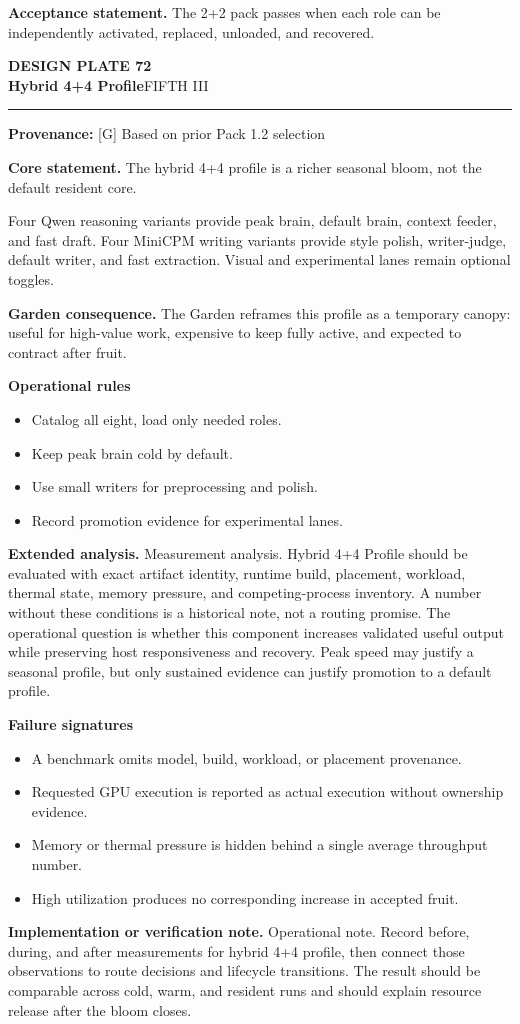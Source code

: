 \documentclass[10pt,letterpaper,oneside]{article}
\newcommand{\prov}[1]{\textcolor{gardenBlue}{\sffamily\footnotesize\textbf{Provenance:} #1}}
\newcommand{\platetitle}[3]{%
  \begin{minipage}[t][0.54in][t]{\textwidth}
  {\sffamily\bfseries\color{gardenDeep}\fontsize{9}{10}\selectfont DESIGN PLATE #1}\\[-1pt]
  {\sffamily\bfseries\color{gardenInk}\fontsize{16.5}{18}\selectfont #2}\hfill{\sffamily\color{gardenGreen}\large #3}
  \end{minipage}\vspace{-2pt}\hrule\vspace{5pt}}
\begin{document}
\begin{acceptbox}
\textbf{Acceptance statement.} The 2+2 pack passes when each role can be independently activated, replaced, unloaded, and recovered.
\end{acceptbox}
\newpage
\platetitle{72}{Hybrid 4+4 Profile}{FIFTH III}
\prov{[G] Based on prior Pack 1.2 selection}
\fontsize{8.85}{10.45}\selectfont
\begin{corebox}
\textbf{Core statement.} The hybrid 4+4 profile is a richer seasonal bloom, not the default resident core.
\end{corebox}
Four Qwen reasoning variants provide peak brain, default brain, context feeder, and fast draft. Four MiniCPM writing variants provide style polish, writer-judge, default writer, and fast extraction. Visual and experimental lanes remain optional toggles.

\textbf{Garden consequence.} The Garden reframes this profile as a temporary canopy: useful for high-value work, expensive to keep fully active, and expected to contract after fruit.

\textbf{Operational rules}
\begin{itemize}
\item Catalog all eight, load only needed roles.
\item Keep peak brain cold by default.
\item Use small writers for preprocessing and polish.
\item Record promotion evidence for experimental lanes.
\end{itemize}
\textbf{Extended analysis.} Measurement analysis. Hybrid 4+4 Profile should be evaluated with exact artifact identity, runtime build, placement, workload, thermal state, memory pressure, and competing-process inventory. A number without these conditions is a historical note, not a routing promise. The operational question is whether this component increases validated useful output while preserving host responsiveness and recovery. Peak speed may justify a seasonal profile, but only sustained evidence can justify promotion to a default profile.

\textbf{Failure signatures}
\begin{itemize}
\item A benchmark omits model, build, workload, or placement provenance.
\item Requested GPU execution is reported as actual execution without ownership evidence.
\item Memory or thermal pressure is hidden behind a single average throughput number.
\item High utilization produces no corresponding increase in accepted fruit.
\end{itemize}
\textbf{Implementation or verification note.} Operational note. Record before, during, and after measurements for hybrid 4+4 profile, then connect those observations to route decisions and lifecycle transitions. The result should be comparable across cold, warm, and resident runs and should explain resource release after the bloom closes.
\end{document}
